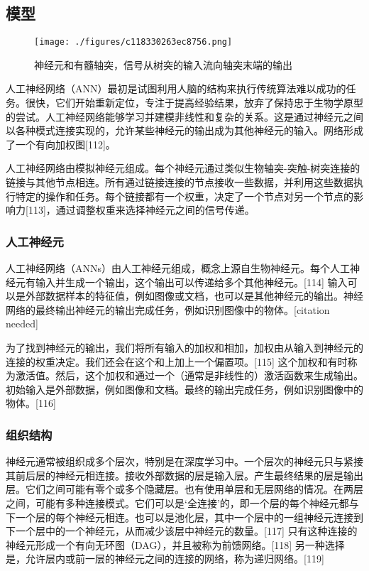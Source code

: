 \subsection{模型}
\begin{figure}[ht]
\centering
\texttt{[image: ./figures/c118330263ec8756.png]}
\caption{神经元和有髓轴突，信号从树突的输入流向轴突末端的输出} \label{fig_RGSJ_2}
\end{figure}
人工神经网络（ANN）最初是试图利用人脑的结构来执行传统算法难以成功的任务。很快，它们开始重新定位，专注于提高经验结果，放弃了保持忠于生物学原型的尝试。人工神经网络能够学习并建模非线性和复杂的关系。这是通过神经元之间以各种模式连接实现的，允许某些神经元的输出成为其他神经元的输入。网络形成了一个有向加权图[112]。

人工神经网络由模拟神经元组成。每个神经元通过类似生物轴突-突触-树突连接的链接与其他节点相连。所有通过链接连接的节点接收一些数据，并利用这些数据执行特定的操作和任务。每个链接都有一个权重，决定了一个节点对另一个节点的影响力[113]，通过调整权重来选择神经元之间的信号传递。
\subsubsection{人工神经元}  
人工神经网络（ANNs）由人工神经元组成，概念上源自生物神经元。每个人工神经元有输入并生成一个输出，这个输出可以传递给多个其他神经元。[114] 输入可以是外部数据样本的特征值，例如图像或文档，也可以是其他神经元的输出。神经网络的最终输出神经元的输出完成任务，例如识别图像中的物体。[citation needed]

为了找到神经元的输出，我们将所有输入的加权和相加，加权由从输入到神经元的连接的权重决定。我们还会在这个和上加上一个偏置项。[115] 这个加权和有时称为激活值。然后，这个加权和通过一个（通常是非线性的）激活函数来生成输出。初始输入是外部数据，例如图像和文档。最终的输出完成任务，例如识别图像中的物体。[116]
\subsubsection{组织结构}  
神经元通常被组织成多个层次，特别是在深度学习中。一个层次的神经元只与紧接其前后层的神经元相连接。接收外部数据的层是输入层。产生最终结果的层是输出层。它们之间可能有零个或多个隐藏层。也有使用单层和无层网络的情况。在两层之间，可能有多种连接模式。它们可以是‘全连接’的，即一个层的每个神经元都与下一个层的每个神经元相连。也可以是池化层，其中一个层中的一组神经元连接到下一个层中的一个神经元，从而减少该层中神经元的数量。[117] 只有这种连接的神经元形成一个有向无环图（DAG），并且被称为前馈网络。[118] 另一种选择是，允许层内或前一层的神经元之间的连接的网络，称为递归网络。[119]
